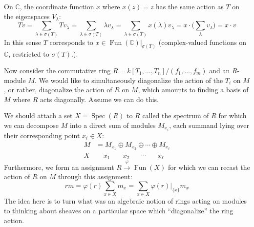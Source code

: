 \documentclass[11pt,leqno]{article}
\theoremstyle{plain}
\theoremstyle{definition}
\numberwithin{equation}{section}
\numberwithin{lem}{section}
\DeclareMathOperator{\Fun}{Fun}
\DeclareMathOperator{\Spec}{Spec}
\begin{document}
On $\mathbb C$, the coordinate function $x$ where $x(z) = z$ has the same action as $T$ on the eigenspaces $V_\lambda$:
\[Tv = \sum_{\lambda\in\sigma(T)}Tv_\lambda = \sum_{\lambda\in\sigma(T)}\lambda v_\lambda = \sum_{\lambda\in\sigma(T)}x(\lambda) v_\lambda = x\cdot \biggl(\sum_\lambda v_\lambda\biggr) = x\cdot v\] 
In this sense $T$ corresponds to $x\in \Fun(\mathbb C)|_{\sigma(T)}$ (complex-valued functions on $\mathbb C$, restricted to $\sigma(T)$.).

Now consider the commutative ring $R = k[T_1,\dots,T_n]/(f_1,\dots,f_m)$ and an $R$-module $M$. We would like to simultaneously diagonalize the action of the $T_i$ on $M$, or rather, diagonalize the action of $R$ on $M$, which amounts to finding a basis of $M$ where $R$ acts diagonally. Assume we can do this. 

We should attach a set $X = \Spec(R)$ to $R$ called the spectrum of $R$ for which we can decompose $M$ into a direct sum of modules $M_{x_i}$, each summand lying over their corresponding point $x_i\in X$:
\begin{align*}
  M &= M_{x_1} \oplus M_{x_2} \oplus \cdots \oplus M_{x_\ell}\\
  X&~~~~~x_1~\phantom{\oplus}~~x_2~~\phantom{\oplus} \cdots \phantom{\oplus}~~x_\ell
\end{align*}
Furthermore, we form an assignment $R\xrightarrow{\varphi} \Fun(X)$ for which we can recast the action of $R$ on $M$ through this assignment:
\[rm = \varphi(r)\sum_{x\in X}m_x = \sum_{x\in X}\varphi(r)|_{\{x\}}m_x\]
The idea here is to turn what was an algebraic notion of rings acting on modules to thinking about sheaves on a particular space which ``diagonalize'' the ring action.
\end{document}
